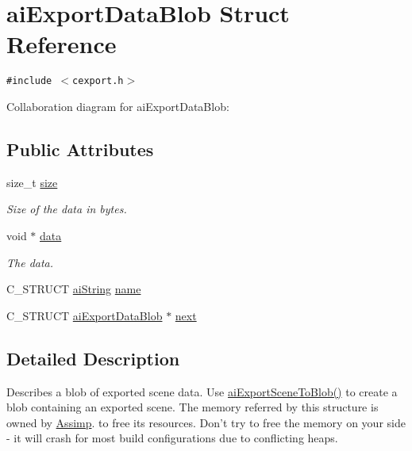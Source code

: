 \hypertarget{structai_export_data_blob}{
\section{aiExportDataBlob Struct Reference}
\label{structai_export_data_blob}
}
{\tt \#include $<$cexport.h$>$}

Collaboration diagram for aiExportDataBlob:\subsection*{Public Attributes}
\begin{CompactItemize}
\item 
\hypertarget{structai_export_data_blob_339bfaacc70396b2f99f94c1bc3b808f}{
size\_\-t \hyperlink{structai_export_data_blob_339bfaacc70396b2f99f94c1bc3b808f}{size}}
\label{structai_export_data_blob_339bfaacc70396b2f99f94c1bc3b808f}

\begin{CompactList}\small\item\em Size of the data in bytes. \item\end{CompactList}\item 
\hypertarget{structai_export_data_blob_c080c780dad92077b42447d77a1a9ed1}{
void $\ast$ \hyperlink{structai_export_data_blob_c080c780dad92077b42447d77a1a9ed1}{data}}
\label{structai_export_data_blob_c080c780dad92077b42447d77a1a9ed1}

\begin{CompactList}\small\item\em The data. \item\end{CompactList}\item 
C\_\-STRUCT \hyperlink{structai_string}{aiString} \hyperlink{structai_export_data_blob_f7f006ac5ad818c0d81d520a84f74c3e}{name}
\item 
C\_\-STRUCT \hyperlink{structai_export_data_blob}{aiExportDataBlob} $\ast$ \hyperlink{structai_export_data_blob_3e98fa760f45983ff1bccec6715f3817}{next}
\end{CompactItemize}


\subsection{Detailed Description}
Describes a blob of exported scene data. Use \hyperlink{cexport_8h_33b02f2dbfd79980bf29e62f3a64139f}{aiExportSceneToBlob()} to create a blob containing an exported scene. The memory referred by this structure is owned by \hyperlink{namespace_assimp}{Assimp}. to free its resources. Don't try to free the memory on your side - it will crash for most build configurations due to conflicting heaps.

